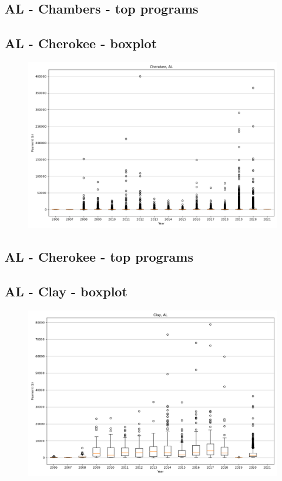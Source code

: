 \subsection*{AL - Chambers - top programs}

\newpage
\subsection*{AL - Cherokee - boxplot}
\begin{figure}[h]
\centering
\includegraphics[width=7in]{../output/boxplots/counties/Cherokee-AL_boxplot.png}
\end{figure}


\subsection*{AL - Cherokee - top programs}

\newpage
\subsection*{AL - Clay - boxplot}
\begin{figure}[h]
\centering
\includegraphics[width=7in]{../output/boxplots/counties/Clay-AL_boxplot.png}
\end{figure}


